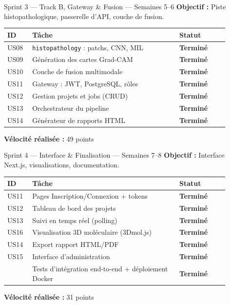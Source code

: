 \documentclass[12pt,a4paper,oneside]{book}
\begin{document}
\vspace{0.8em}

\begin{sprintbox}{Sprint 3 — Track B, Gateway \& Fusion — Semaines 5--6}
\textbf{Objectif :} Piste histopathologique, passerelle d'API, couche de fusion.

\medskip
\begin{tabular}{L{0.10\linewidth} L{0.60\linewidth} L{0.20\linewidth}}
\textbf{ID} & \textbf{Tâche} & \textbf{Statut} \\
\hline
US08 & \texttt{histopathology} : patchs, CNN, MIL & \textcolor{green!60!black}{\textbf{Terminé}} \\
US09 & Génération des cartes Grad-CAM & \textcolor{green!60!black}{\textbf{Terminé}} \\
US10 & Couche de fusion multimodale & \textcolor{green!60!black}{\textbf{Terminé}} \\
US11 & Gateway : JWT, PostgreSQL, rôles & \textcolor{green!60!black}{\textbf{Terminé}} \\
US12 & Gestion projets et jobs (CRUD) & \textcolor{green!60!black}{\textbf{Terminé}} \\
US13 & Orchestrateur du pipeline & \textcolor{green!60!black}{\textbf{Terminé}} \\
US14 & Générateur de rapports HTML & \textcolor{green!60!black}{\textbf{Terminé}} \\
\end{tabular}

\medskip\textbf{Vélocité réalisée :} 49 points
\end{sprintbox}

\vspace{0.8em}

\begin{sprintbox}{Sprint 4 — Interface \& Finalisation — Semaines 7--8}
\textbf{Objectif :} Interface Next.js, visualisations, documentation.

\medskip
\begin{tabular}{L{0.10\linewidth} L{0.60\linewidth} L{0.20\linewidth}}
\textbf{ID} & \textbf{Tâche} & \textbf{Statut} \\
\hline
US11 & Pages Inscription/Connexion + tokens & \textcolor{green!60!black}{\textbf{Terminé}} \\
US12 & Tableau de bord des projets & \textcolor{green!60!black}{\textbf{Terminé}} \\
US13 & Suivi en temps réel (polling) & \textcolor{green!60!black}{\textbf{Terminé}} \\
US16 & Visualisation 3D moléculaire (3Dmol.js) & \textcolor{green!60!black}{\textbf{Terminé}} \\
US14 & Export rapport HTML/PDF & \textcolor{green!60!black}{\textbf{Terminé}} \\
US15 & Interface d'administration & \textcolor{green!60!black}{\textbf{Terminé}} \\
     & Tests d'intégration end-to-end + déploiement Docker & \textcolor{green!60!black}{\textbf{Terminé}} \\
\end{tabular}

\medskip\textbf{Vélocité réalisée :} 31 points
\end{sprintbox}
\end{document}
